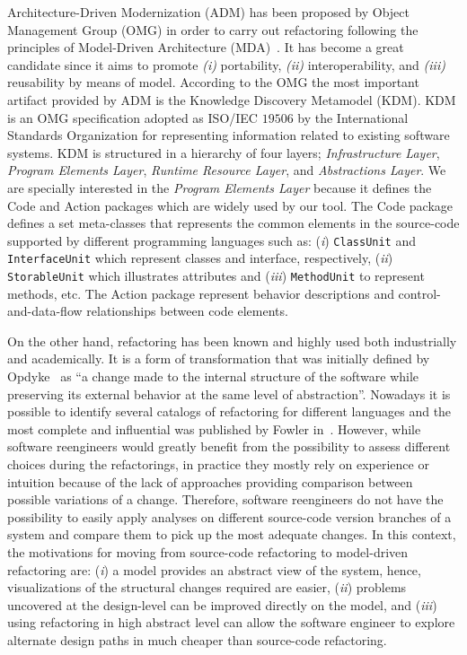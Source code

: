 Architecture-Driven Modernization (ADM) has been proposed by Object Management Group (OMG) in order to carry out refactoring following the principles of Model-Driven Architecture (MDA)~\cite{Kleppe:2003}. It has become a great candidate since it aims to promote \textit{(i)} portability, \textit{(ii)} interoperability, and \textit{(iii)} reusability by means of model. According to the OMG the most important artifact provided by ADM is the Knowledge Discovery Metamodel (KDM). KDM is an OMG specification adopted as ISO/IEC $19506$ by the International Standards Organization for representing information related to existing software systems.  KDM is structured in a hierarchy of four layers; \textit{Infrastructure Layer}, \textit{Program Elements Layer}, \textit{ Runtime Resource Layer}, and \textit{Abstractions Layer}. We are specially interested in the \textit{Program Elements Layer} because it defines the Code and Action packages which are widely used by our tool. The Code package defines a set meta-classes that represents the common elements in the source-code supported by different programming languages such as: (\textit{i}) \texttt{ClassUnit} and \texttt{InterfaceUnit} which represent classes and interface, respectively, (\textit{ii}) \texttt{StorableUnit} which illustrates attributes and (\textit{iii}) \texttt{MethodUnit} to represent methods, etc. The Action package represent behavior descriptions and control-and-data-flow relationships between code elements.

On the other hand, refactoring has been known and highly used both industrially and academically. It is a form of transformation that was initially defined by Opdyke~\cite{Opdy92b} as ``a change made to the internal structure of the software while preserving its external behavior at the same level of abstraction''. Nowadays it is possible to identify several catalogs of refactoring for different languages and the most complete and influential was published by Fowler in~\cite{refactImpro}. 
However, while software reengineers would greatly benefit from the possibility to assess different choices during the refactorings, in practice they mostly rely on experience or intuition because of the lack of approaches providing comparison between possible variations of a change. 
Therefore, software reengineers do not have the possibility to easily apply analyses on different source-code version branches of a system and compare them to pick up the most adequate changes. In this context, the motivations for moving from source-code refactoring  to model-driven refactoring are: 
(\textit{i}) a model provides an abstract view of the system, hence, visualizations of the structural changes required are easier, 
(\textit{ii}) problems uncovered at the design-level can be improved directly on the model, and 
(\textit{iii}) using refactoring in high abstract level can allow the software engineer to explore alternate design paths in much cheaper than source-code refactoring.

